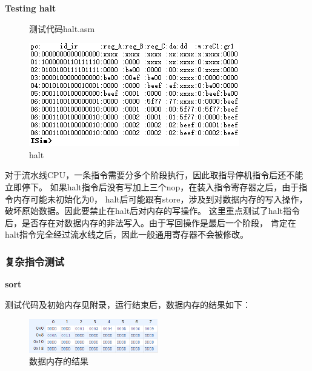 \documentclass[10pt,a4paper,fleqn]{article}
\begin{document}
\par {\bf Testing halt}
\begin{figure}[H]
  \begin{minipage}{0.4\textwidth}
    测试代码halt.asm
    
  \end{minipage}
  \hspace{1em}
  \begin{minipage}{0.55\textwidth}
    \centering
    \includegraphics[width=\textwidth]{figure/simu/halttest.png}
    \caption{halt}
  \end{minipage}
\end{figure}
\par 对于流水线CPU，一条指令需要分多个阶段执行，因此取指导停机指令后还不能立即停下。
如果halt指令后没有写加上三个nop，在装入指令寄存器之后，由于指令内存可能未初始化为0，
halt后可能跟有store，涉及到对数据内存的写入操作，破坏原始数据。因此要禁止在halt后对内存的写操作。
这里重点测试了halt指令后，是否存在对数据内存的非法写入。由于写回操作是最后一个阶段，
肯定在halt指令完全经过流水线之后，因此一般通用寄存器不会被修改。

\subsubsection{复杂指令测试}
\indent\par {\bf sort}
\par 测试代码及初始内存见附录，运行结束后，数据内存的结果如下：
\begin{figure}[H]
  \centering
  \includegraphics[width=0.5\textwidth]{figure/simu/advance/sort.png}
  \caption{数据内存的结果}
\end{figure}
\end{document}

